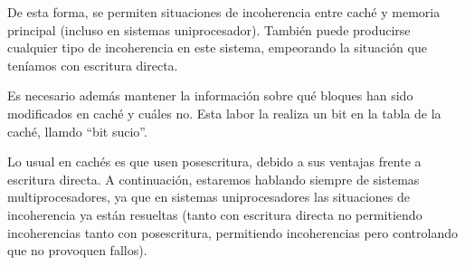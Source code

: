\begin{description}
        De esta forma, se permiten situaciones de incoherencia entre caché y memoria principal (incluso en sistemas uniprocesador). También puede producirse cualquier tipo de incoherencia en este sistema, empeorando la situación que teníamos con escritura directa.

        Es necesario además mantener la información sobre qué bloques han sido modificados en caché y cuáles no. Esta labor la realiza un bit en la tabla de la caché, llamdo ``bit sucio''.
\end{description}
Lo usual en cachés es que usen posescritura, debido a sus ventajas frente a escritura directa. A continuación, estaremos hablando siempre de sistemas multiprocesadores, ya que en sistemas uniprocesadores las situaciones de incoherencia ya están resueltas (tanto con escritura directa no permitiendo incoherencias tanto con posescritura, permitiendo incoherencias pero controlando que no provoquen fallos).

